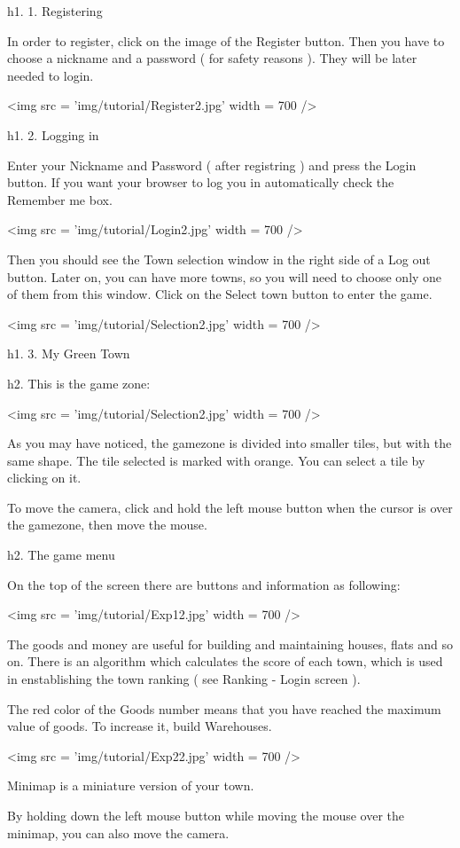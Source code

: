 h1. 1. Registering

In order to register, click on the image of the Register button. Then you have to choose a nickname and a password ( for safety reasons ). They will be later needed to login.

<img src = 'img/tutorial/Register2.jpg' width = 700 />

h1. 2. Logging in

Enter your Nickname and Password ( after registring ) and press the Login button. If you want your browser to log you in automatically check the Remember me box.

<img src = 'img/tutorial/Login2.jpg' width = 700 />

Then you should see the Town selection window in the right side of a Log out button. Later on, you can have more towns, so you will need to choose only one of them from this window. Click on the Select town button to enter the game.

<img src = 'img/tutorial/Selection2.jpg' width = 700 />

h1. 3. My Green Town

h2. This is the game zone:

<img src = 'img/tutorial/Selection2.jpg' width = 700 />

As you may have noticed, the gamezone is divided into smaller tiles, but with the same shape. The tile selected is marked with orange. You can select a tile by clicking on it.

To move the camera, click and hold the left mouse button when the cursor is over the gamezone, then move the mouse.

h2. The game menu

On the top of the screen there are buttons and information as following:

<img src = 'img/tutorial/Exp12.jpg' width = 700 />

The goods and money are useful for building and maintaining houses, flats and so on. There is an algorithm which calculates the score of each town, which is used in enstablishing the town ranking ( see Ranking - Login screen ).

The red color of the Goods number means that you have reached the maximum value of goods. To increase it, build Warehouses.

<img src = 'img/tutorial/Exp22.jpg' width = 700 />

Minimap is a miniature version of your town.

By holding down the left mouse button while moving the mouse over the minimap, you can also move the camera.

